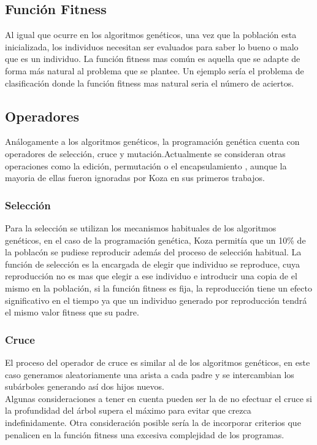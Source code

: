 \documentclass[12pt]{article} \usepackage[utf8x]{inputenc}
\begin{document}
 \subsection{Función Fitness}
 
 Al igual que ocurre en los algoritmos genéticos, una vez que la población esta inicializada, los individuos necesitan ser evaluados para saber lo bueno o malo que es un individuo. La función fitness mas común es aquella que se adapte de forma más natural al problema que se plantee. Un ejemplo sería  el problema de clasificación donde la función fitness mas natural seria el número de aciertos.
 
 \subsection{Operadores}
 
 Análogamente a los algoritmos genéticos, la programación genética cuenta con operadores de selección, cruce y mutación.Actualmente se consideran otras operaciones como la edición, permutación o el encapsulamiento , aunque la mayoria de ellas fueron ignoradas por Koza en sus primeros trabajos.
 
 \subsubsection{Selección}
 
 Para la selección se utilizan los mecanismos habituales de los algoritmos genéticos, en el caso de la programación genética, Koza permitía que un 10\% de la poblacón se pudiese reproducir además del proceso de selección habitual. La función de selección es la encargada de elegir que individuo se reproduce, cuya reproducción no es mas que elegir a ese individuo e introducir una copia de el mismo en la población, si la función fitness es fija, la reproducción tiene un efecto significativo en el tiempo ya que un individuo generado por reproducción tendrá el mismo valor fitness que su padre.
 
 \subsubsection{Cruce}
 
 El proceso del operador de cruce es similar al de los algoritmos genéticos, en este caso generamos aleatoriamente una arista a cada padre y se intercambian los subárboles generando así dos hijos nuevos.\\
 Algunas consideraciones a tener en cuenta pueden ser la de no efectuar el cruce si la profundidad del árbol supera el máximo para evitar que crezca indefinidamente. Otra consideración posible sería la de incorporar criterios que penalicen en la función fitness una excesiva complejidad de los programas.
 
\end{document}
